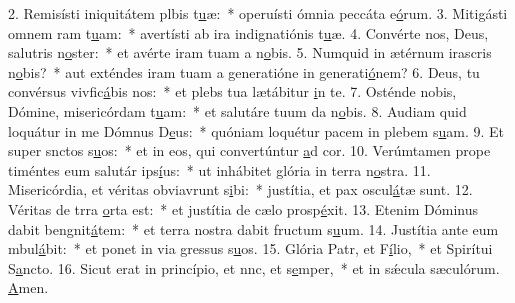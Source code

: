 2. Remisísti iniquitátem plbis t\uline{u}æ:~* operuísti ómnia peccáta e\uline{ó}rum.
3. Mitigásti omnem ram t\uline{u}am:~* avertísti ab ira indignatiónis t\uline{u}æ.
4. Convérte nos, Deus, salutris n\uline{o}ster:~* et avérte iram tuam a n\uline{o}bis.
5. Numquid in ætérnum irascris n\uline{o}bis?~* aut exténdes iram tuam a generatióne in generati\uline{ó}nem?
6. Deus, tu convérsus vivfic\uline{á}bis nos:~* et plebs tua lætábitur \uline{i}n te.
7. Osténde nobis, Dómine, misericórdam t\uline{u}am:~* et salutáre tuum da n\uline{o}bis.
8. Audiam quid loquátur in me Dómnus D\uline{e}us:~* quóniam loquétur pacem in plebem s\uline{u}am.
9. Et super snctos s\uline{u}os:~* et in eos, qui convertúntur \uline{a}d cor.
10. Verúmtamen prope timéntes eum salutár ips\uline{í}us:~* ut inhábitet glória in terra n\uline{o}stra.
11. Misericórdia, et véritas obviavrunt s\uline{i}bi:~* justítia, et pax oscul\uline{á}tæ sunt.
12. Véritas de trra \uline{o}rta est:~* et justítia de cælo prosp\uline{é}xit.
13. Etenim Dóminus dabit bengnit\uline{á}tem:~* et terra nostra dabit fructum s\uline{u}um.
14. Justítia ante eum mbul\uline{á}bit:~* et ponet in via gressus s\uline{u}os.
15. Glória Patr, et F\uline{í}lio,~* et Spirítui S\uline{a}ncto.
16. Sicut erat in princípio, et nnc, et s\uline{e}mper,~* et in sǽcula sæculórum. \uline{A}men.
